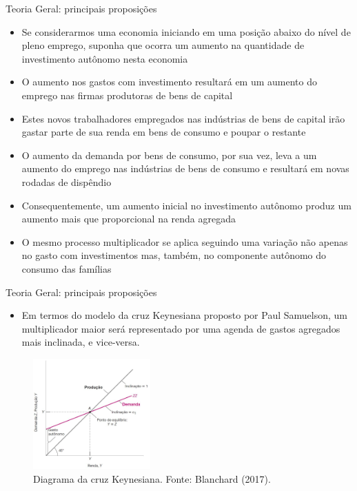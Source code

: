 \documentclass[10pt]{beamer}
\begin{document}
\begin{frame}{Teoria Geral: principais proposições}
    \begin{itemize}
        \item Se considerarmos uma economia iniciando em uma posição abaixo do nível de pleno emprego, suponha que ocorra um aumento na quantidade de investimento autônomo nesta economia
        \bigskip
        \item O aumento nos gastos com investimento resultará em um aumento do emprego nas firmas produtoras de bens de capital
        \bigskip
        \item Estes novos trabalhadores empregados nas indústrias de bens de capital irão gastar parte de sua renda em bens de consumo e poupar o restante
        \bigskip
        \item O aumento da demanda por bens de consumo, por sua vez, leva a um aumento do emprego nas indústrias de bens de consumo e resultará em novas rodadas de dispêndio
        \bigskip
        \item Consequentemente, um aumento inicial no investimento autônomo produz um aumento mais que proporcional na renda agregada
        \bigskip
        \item O mesmo processo multiplicador se aplica seguindo uma variação não apenas no gasto com investimentos mas, também, no componente autônomo do consumo das famílias
    \end{itemize}
\end{frame}

\begin{frame}{Teoria Geral: principais proposições}
    \begin{itemize}
        \item Em termos do modelo da cruz Keynesiana proposto por Paul Samuelson, um multiplicador maior será representado por uma agenda de gastos agregados mais inclinada, e vice-versa.
    \end{itemize}
    \begin{figure}
        \centering
        \includegraphics[width=0.4\textwidth]{./figures/aula4_fig3}
        \caption{Diagrama da cruz Keynesiana. Fonte: Blanchard (2017).}        
    \end{figure}
\end{frame}
\end{document}

